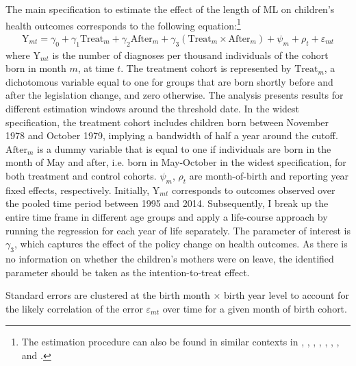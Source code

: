 The main specification to estimate the effect of the length of ML on children's health outcomes corresponds to the following equation:\footnote{The estimation procedure can also be found in similar contexts in \cite{RafaelLaliveandJosefZweimuller2009}, \cite{Dustmann2012}, \cite{Ekberg2013parental}, \cite{schonberg2014expansions}, \cite{Lalive2014}, \cite{danzer2017}, \cite{avdic2018modern}, and \cite{Huebener2017}.} %
\begin{align}
\text{Y}_{mt} = \gamma_0 + \gamma_1 \text{Treat}_{m} + \gamma_2 \text{After}_{m} + \gamma_3 (\text{Treat}_{m} \times \text{After}_{m}) + \psi_m + \rho_t + \varepsilon_{mt} \label{eq_mlch:DD_basline}
\end{align}
where $\text{Y}_{mt}$ is the number of diagnoses per thousand individuals of the cohort born in month $m$, at time $t$. The treatment cohort is represented by $\text{Treat}_{m}$, a dichotomous variable equal to one for groups that are born shortly before and after the legislation change, and zero otherwise. The analysis presents results for different estimation windows around the threshold date. In the widest specification, the treatment cohort includes children born between November 1978 and October 1979, implying a bandwidth of half a year around the cutoff. $\text{After}_{m}$ is a dummy variable that is equal to one if individuals are born in the month of May and after, i.e. born in May-October in the widest specification, for both treatment and control cohorts. $\psi_m$, $\rho_t$ are month-of-birth and reporting year fixed effects, respectively. Initially, $\text{Y}_{mt}$ corresponds to outcomes observed over the pooled time period between 1995 and 2014. Subsequently, I break up the entire time frame in different age groups and apply a life-course approach by running the regression for each year of life separately. The parameter of interest is $\gamma_3$, which captures the effect of the policy change on health outcomes. As there is no information on whether the children's mothers were on leave, the identified parameter should be taken as the intention-to-treat effect.

Standard errors are clustered at the birth month $\times$ birth year level to account for the likely correlation of the error $\varepsilon_{mt}$ over time for a given month of birth cohort.


